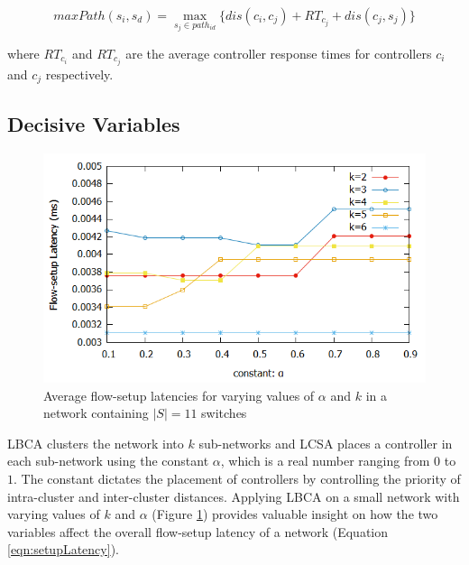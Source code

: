 \documentclass[a4paper,fleqn]{cas-dc}
\begin{document}
\begin{equation}
maxPath(s_i,s_d) = \max_{s_j\in path_{id}}\{dis(c_i,c_j)+RT_{c_j}+dis(c_j,s_j)\}
\end{equation}

where $RT_{c_i}$  and $RT_{c_j}$ are the average controller response times for controllers $c_i$ and $c_j$ respectively.

\subsection{Decisive Variables} \label{optimumK}

\begin{figure}[t]
	\centering
	\includegraphics[width=0.95\linewidth]{Images/Abilene_Analysis.png}
	\caption{Average flow-setup latencies for varying values of $\alpha$ and $k$ in a network containing $|S|=11$ switches} \label{fig:abileneA}
\end{figure}

\noindent LBCA clusters the network into $k$ sub-networks and LCSA places a controller in each sub-network using the constant $\alpha$, which is a real number ranging from $0$ to $1$. The constant dictates the placement of controllers by controlling the priority of intra-cluster and inter-cluster distances. Applying LBCA on a small network with varying values of $k$ and $\alpha$ (Figure \ref{fig:abileneA}) provides valuable insight on how the two variables affect the overall flow-setup latency of a network (Equation \ref{eqn:setupLatency}).
\end{document}

